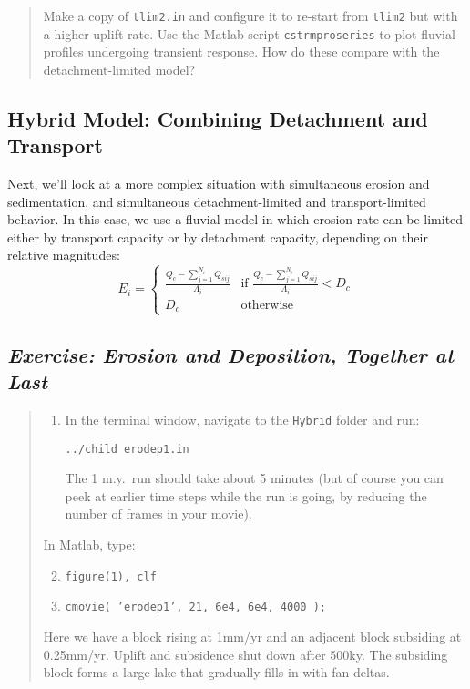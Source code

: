 \documentclass[12pt,reqno]{amsart}
\begin{document}
\begin{quote}
\small
{ Make a copy of {\tt tlim2.in} and
  configure it to re-start from {\tt tlim2} but with a higher uplift
  rate. Use the Matlab script {\tt cstrmproseries} to plot fluvial
  profiles undergoing transient response. How do these compare with
  the detachment-limited model?}
\end{quote}

\subsection{Hybrid Model: Combining Detachment and Transport}

Next, we'll look at a more complex situation with simultaneous erosion and sedimentation, and simultaneous detachment-limited and transport-limited behavior. In this case, we use a fluvial model in which erosion rate can be limited either by transport capacity or by detachment capacity, depending on their relative magnitudes:
\begin{equation}
E_i =
\begin{cases}
\frac{Q_c - \sum_{j=1}^{N_i} Q_{sij}}{\Lambda_i} & \text{if $\frac{Q_c - \sum_{j=1}^{N_i} Q_{sij}}{\Lambda_i} < D_c$} \\
D_c & \text{otherwise}
\end{cases}
\end{equation}

\subsection*{\em Exercise: Erosion and Deposition, Together at Last}

\begin{quote}
\small
{\sf
\begin{enumerate}
\item
In the terminal window, navigate to the {\tt Hybrid} folder and run:

{\tt ../child erodep1.in}

\noindent
The 1 m.y.\ run should take about 5 minutes (but of course you can
peek at earlier time steps while the run is going, by reducing the
number of frames in your movie).
\end{enumerate}

\noindent
In Matlab, type: 
\begin{enumerate}
\setcounter{enumi}{1}
\item
{\tt figure(1), clf}
\item
{\tt cmovie( 'erodep1', 21, 6e4, 6e4, 4000 );}
\end{enumerate}

\noindent
Here we have a block rising at 1mm/yr and an adjacent block subsiding
at 0.25mm/yr. Uplift and subsidence shut down after 500ky. The
subsiding block forms a large lake that gradually fills in with
fan-deltas.
}
\end{quote}
\end{document}
